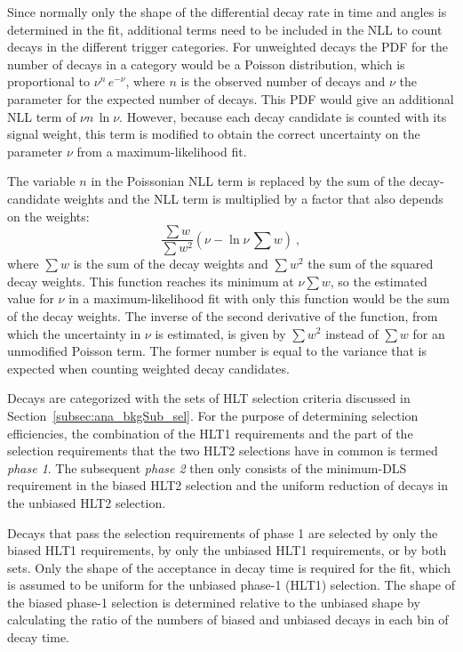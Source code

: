 Since normally only the shape of the differential decay rate in time and angles is determined in the fit, additional terms need to be
included in the NLL to count decays in the different trigger categories. For unweighted decays the PDF for the number of decays in a
category would be a Poisson distribution, which is proportional to $\nu^n\,e^{-\nu}$, where $n$ is the observed number of decays and $\nu$
the parameter for the expected number of decays. This PDF would give an additional NLL term of $\nu$\textminus$n\,\ln\nu$. However, because
each decay candidate is counted with its signal weight, this term is modified to obtain the correct uncertainty on the parameter $\nu$ from
a maximum-likelihood fit.

The variable $n$ in the Poissonian NLL term is replaced by the sum of the decay-candidate weights and the NLL term is multiplied by a
factor that also depends on the weights:
\begin{equation}
  \label{eq:weightPoisson}
  \frac{\sum w}{\sum w^2}\left( \nu - \ln\nu\,\sum w \right)\ ,
\end{equation}
where $\sum w$ is the sum of the decay weights and $\sum w^2$ the sum of the squared decay weights. This function reaches its minimum at
$\nu$\texteq$\sum w$, so the estimated value for $\nu$ in a maximum-likelihood fit with only this function would be the sum of the decay
weights. The inverse of the second derivative of the function, from which the uncertainty in $\nu$ is estimated, is given by $\sum w^2$
instead of $\sum w$ for an unmodified Poisson term. The former number is equal to the variance that is expected when counting weighted
decay candidates.

Decays are categorized with the sets of HLT selection criteria discussed in Section~\ref{subsec:ana_bkgSub_sel}. For the purpose of
determining selection efficiencies, the combination of the HLT1 requirements and the part of the selection requirements that the two HLT2
selections have in common is termed \emph{phase 1}. The subsequent \emph{phase 2} then only consists of the minimum-DLS requirement in the
biased HLT2 selection and the uniform reduction of decays in the unbiased HLT2 selection.

Decays that pass the selection requirements of phase 1 are selected by only the biased HLT1 requirements, by only the unbiased HLT1
requirements, or by both sets. Only the shape of the acceptance in decay time is required for the fit, which is assumed to be uniform for
the unbiased phase-1 (HLT1) selection. The shape of the biased phase-1 selection is determined relative to the unbiased shape by
calculating the ratio of the numbers of biased and unbiased decays in each bin of decay time.

